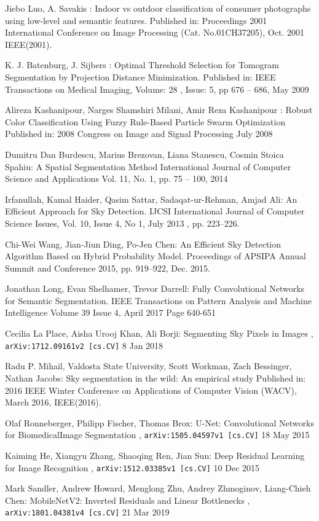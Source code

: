 \documentclass[runningheads]{llncs}
\begin{document}
\begin{thebibliography}{8}
 Jiebo Luo, A. Savakis : Indoor vs outdoor classification of consumer photographs using low-level and semantic features. 
 Published in: Proceedings 2001 International Conference on Image Processing (Cat. No.01CH37205), Oct. 2001 
IEEE(2001). 

 K. J. Batenburg, J. Sijbers : Optimal Threshold Selection for Tomogram Segmentation by Projection Distance Minimization. 
 Published in: IEEE Transactions on Medical Imaging, Volume: 28 , Issue: 5, pp  676 -- 686, May 2009 

 Alireza Kashanipour, Narges Shamshiri Milani, Amir Reza Kashanipour : Robust Color Classification Using Fuzzy Rule-Based Particle Swarm Optimization
Published in: 2008 Congress on Image and Signal Processing 
July 2008

Dumitru Dan Burdescu, Marius Brezovan, Liana Stanescu, Cosmin Stoica Spahiu: A Spatial Segmentation Method
International Journal of Computer Science and Applications
Vol. 11, No. 1, pp. 75 -- 100, 2014 

Irfanullah, Kamal Haider, Qasim Sattar, Sadaqat-ur-Rehman, Amjad Ali: An Efficient Approach for Sky Detection. 
IJCSI International Journal of Computer Science Issues, Vol. 10, Issue 4, No 1, July 2013
, pp. 223--226.

Chi-Wei Wang, Jian-Jiun Ding, Po-Jen Chen: An Efficient Sky Detection Algorithm Based on Hybrid Probability Model. 
Proceedings of APSIPA Annual Summit and Conference 2015, pp. 919--922, Dec. 2015.

Jonathan Long, Evan Shelhamer, Trevor Darrell: Fully Convolutional Networks for Semantic Segmentation. 
IEEE Transactions on Pattern Analysis and Machine Intelligence
Volume 39 Issue 4, April 2017
Page 640-651 

Cecilia La Place, Aisha Urooj Khan, Ali Borji: Segmenting Sky Pixels in Images
, {\tt  arXiv:1712.09161v2 [cs.CV]}
8 Jan 2018

Radu P. Mihail, Valdosta State University, Scott Workman, Zach Bessinger, Nathan Jacobs: Sky segmentation in the wild: An empirical study
Published in: 2016 IEEE Winter Conference on Applications of Computer Vision (WACV), March 2016, IEEE(2016).

Olaf Ronneberger, Philipp Fischer, Thomas Brox: U-Net: Convolutional Networks for BiomedicalImage Segmentation
, {\tt  arXiv:1505.04597v1  [cs.CV]}
18 May 2015

Kaiming He, Xiangyu Zhang, Shaoqing Ren, Jian Sun: Deep Residual Learning for Image Recognition
, {\tt  arXiv:1512.03385v1  [cs.CV]}
10 Dec 2015

Mark Sandler, Andrew Howard, Menglong Zhu, Andrey Zhmoginov, Liang-Chieh Chen: MobileNetV2: Inverted Residuals and Linear Bottlenecks
, {\tt arXiv:1801.04381v4  [cs.CV]}
21 Mar 2019
\end{thebibliography}
\end{document}
